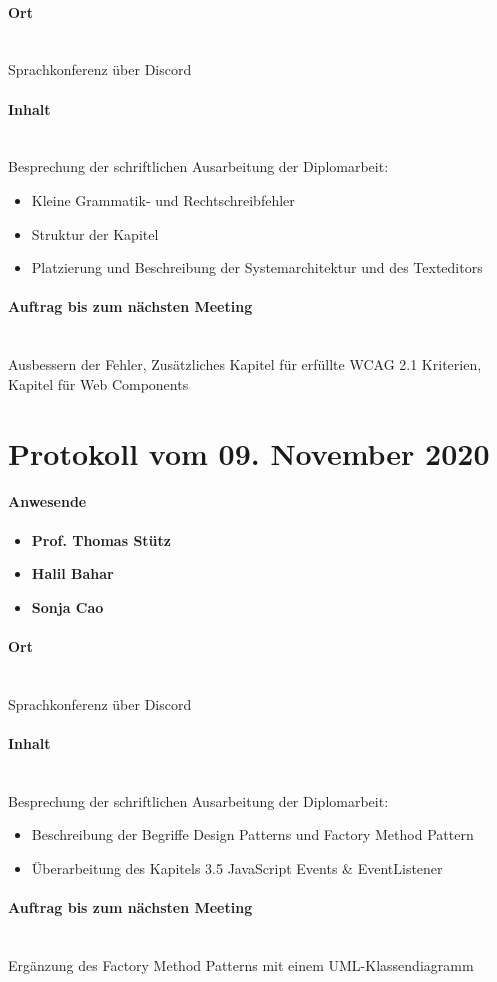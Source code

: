 \paragraph{Ort}\mbox{}\\
Sprachkonferenz über Discord

\paragraph{Inhalt}\mbox{}\\
Besprechung der schriftlichen Ausarbeitung der Diplomarbeit:
\begin{itemize}
	\item{Kleine Grammatik- und Rechtschreibfehler}
	\item{Struktur der Kapitel}
	\item{Platzierung und Beschreibung der Systemarchitektur und des Texteditors}
\end{itemize}

\paragraph{Auftrag bis zum nächsten Meeting}\mbox{}\\
Ausbessern der Fehler, Zusätzliches Kapitel für erfüllte WCAG 2.1 Kriterien, Kapitel für Web Components

\section{Protokoll vom 09. November 2020}

\paragraph{Anwesende}
\begin{itemize}
	\item{\textbf{Prof. Thomas Stütz}}
	\item{\textbf{Halil Bahar}}
	\item{\textbf{Sonja Cao}}
\end{itemize}

\paragraph{Ort}\mbox{}\\
Sprachkonferenz über Discord

\paragraph{Inhalt}\mbox{}\\
Besprechung der schriftlichen Ausarbeitung der Diplomarbeit:
\begin{itemize}
	\item{Beschreibung der Begriffe Design Patterns und Factory Method Pattern}
	\item{Überarbeitung des Kapitels 3.5 JavaScript Events \& EventListener}
\end{itemize}

\paragraph{Auftrag bis zum nächsten Meeting}\mbox{}\\
Ergänzung des Factory Method Patterns mit einem UML-Klassendiagramm